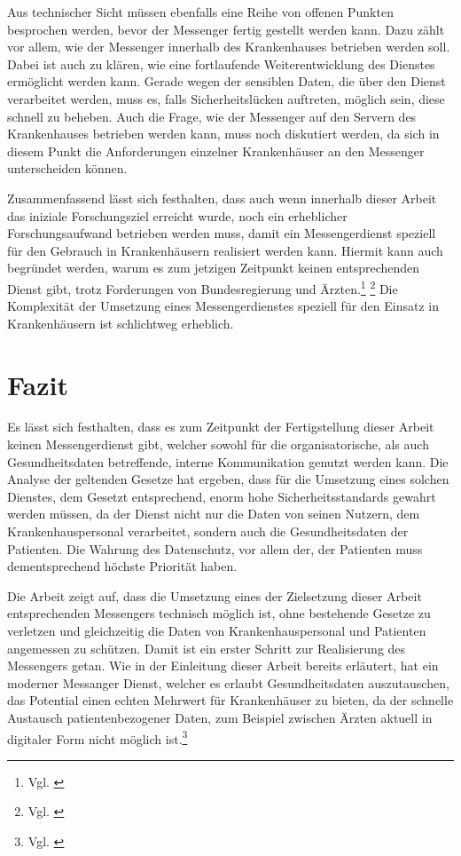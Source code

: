 Aus technischer Sicht müssen ebenfalls eine Reihe von offenen Punkten besprochen werden, bevor der Messenger fertig gestellt werden kann.
Dazu zählt vor allem, wie der Messenger innerhalb des Krankenhauses betrieben werden soll. Dabei ist auch zu klären, wie eine fortlaufende Weiterentwicklung des Dienstes ermöglicht werden kann. Gerade wegen der sensiblen Daten, die über den Dienst verarbeitet werden, muss es, falls Sicherheitslücken auftreten, möglich sein, diese schnell zu beheben. Auch die Frage, wie der Messenger auf den Servern des Krankenhauses betrieben werden kann, muss noch diskutiert werden, da sich in diesem Punkt die Anforderungen einzelner Krankenhäuser an den Messenger unterscheiden können.

Zusammenfassend lässt sich festhalten, dass auch wenn innerhalb dieser Arbeit das iniziale Forschungsziel erreicht wurde, noch ein erheblicher Forschungsaufwand betrieben werden muss, damit ein Messengerdienst speziell für den Gebrauch in Krankenhäusern realisiert werden kann. Hiermit kann auch begründet werden, warum es zum jetzigen Zeitpunkt keinen entsprechenden Dienst gibt, trotz Forderungen von Bundesregierung und Ärzten.\footnote{Vgl. \cite[S. 1 ff.]{Datenschutzkonferenz2019}} \footnote{Vgl. \cite{Giesselmann2018}} Die Komplexität der Umsetzung eines Messengerdienstes speziell für den Einsatz in Krankenhäusern ist schlichtweg erheblich.

\section{Fazit}\label{chapter:fazit}


Es lässt sich festhalten, dass es zum Zeitpunkt der Fertigstellung dieser Arbeit keinen Messengerdienst gibt, welcher sowohl für die organisatorische, als auch Gesundheitsdaten betreffende, interne Kommunikation genutzt werden kann. Die Analyse der geltenden Gesetze hat ergeben, dass für die Umsetzung eines solchen Dienstes, dem Gesetzt entsprechend, enorm hohe Sicherheitsstandards gewahrt werden müssen, da der Dienst nicht nur die Daten von seinen Nutzern, dem Krankenhauspersonal verarbeitet, sondern auch die Gesundheitsdaten der Patienten. Die Wahrung des Datenschutz, vor allem der, der Patienten muss dementsprechend höchste Priorität haben. 

Die Arbeit zeigt auf, dass die Umsetzung eines der Zielsetzung dieser Arbeit entsprechenden Messengers technisch möglich ist, ohne bestehende Gesetze zu verletzen und gleichzeitig die Daten von Krankenhauspersonal und Patienten angemessen zu schützen.
Damit ist ein erster Schritt zur Realisierung des Messengers getan. Wie in der Einleitung dieser Arbeit bereits erläutert, hat ein moderner Messanger Dienst, welcher es erlaubt Gesundheitsdaten auszutauschen, das Potential einen echten Mehrwert für Krankenhäuser zu bieten, da der schnelle Austausch patientenbezogener Daten, zum Beispiel zwischen Ärzten aktuell in digitaler Form nicht möglich ist.\footnote{Vgl. \cite[S. 1292 f.]{G.Murphy2010}}

